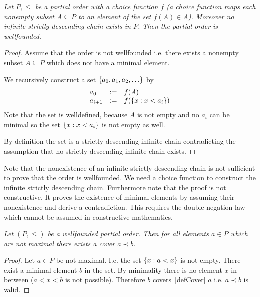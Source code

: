 \begin{theorem}
    \label{thmDCCWellfounded}
    \emph{
        Let $P, \le$ be a partial order with a choice function $f$ (a choice
        function maps each nonempty subset $A \subseteq P$ to an element of the
        set $f(A) \in A$). Moreover no infinite strictly descending chain
        exists in $P$. Then the partial order is wellfounded.
    }

    \begin{proof}
        Assume that the order is not wellfounded i.e. there exists a nonempty
        subset $A \subseteq P$ which does not have a minimal element.

        We recursively construct a set $\left\{a_0, a_1, a_2, \ldots\right\}$ by
        $$
        \begin{array}{lllll} 
            a_0 &:=& f(A)
            \\
            a_{i+1} &:=& f(\left\{x: x < a_i\right\})
         \end{array}
        $$
        Note that the set is welldefined, because $A$ is not empty and no $a_i$
        can be minimal so the set $\left\{x: x < a_i\right\}$ is not empty as well.

        By definition the set is a strictly descending infinite chain
        contradicting the assumption that no strictly descending infinite chain
        exists.
    \end{proof}
\end{theorem}

Note that the nonexistence of an infinite strictly descending chain is not
sufficient to prove that the order is wellfounded. We need a choice function to
construct the infinite strictly descending chain. Furthermore note that the
proof is not constructive. It proves the existence of minimal elements by
assuming their nonexistence and derive a contradiction. This requires the double
negation law which cannot be assumed in constructive mathematics.






\begin{theorem}
    \label{thmWellfoundedHasCover}
    \emph{
        Let $(P, \le)$ be a wellfounded partial order. Then for all elements $a
        \in P$ which are not maximal there exists a cover $a \prec b$.
    }

    \begin{proof}
        Let $a \in P$ be not maximal. I.e. the set $\left\{x: a < x\right\}$ is not
        empty. There exist a minimal element $b$ in the set. By minimality there
        is no element $x$ in between ($a < x < b$ is not possible). Therefore
        $b$ covers~\ref{defCover} $a$ i.e. $a \prec b$ is valid.
    \end{proof}
\end{theorem}
